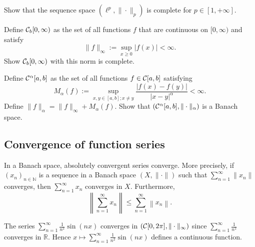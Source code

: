 \begin{exc}
  Show that the sequence space
  $(\ell^p, \|\cdot\|_p)$ is complete
  for $p\in[1,+\infty]$.
\end{exc}

\begin{exc}
  Define ${\cal C}_b[0,\infty)$ as the set of all functions
  $f$ that are continuous on $[0,\infty)$
  and satisfy
  \begin{displaymath}
    \|f\|_{\infty} := \sup_{x\ge 0}|f(x)| < \infty.
  \end{displaymath}
  Show ${\cal C}_b[0,\infty)$ with this norm is complete.
\end{exc}

\begin{exc}
  Define ${\cal C}^{\alpha}[a,b]$ as the set of all functions
  $f\in {\cal C}[a,b]$ satisfying
  \begin{displaymath}
    M_{\alpha}(f) := \sup_{x,y\in[a,b]; x\ne y}
    \frac{|f(x)-f(y)|}{|x-y|^{\alpha}} < \infty.
  \end{displaymath}
  Define $\|f\|_{\alpha} = \|f\|_{\infty}+M_{\alpha}(f)$.
  Show that $({\cal C}^{\alpha}[a,b], \|\cdot\|_{\alpha})$
  is a Banach space.
\end{exc}

\subsection{Convergence of function series}

\begin{thm}
  \label{thm:absolutelyConvergentSeriesConvergeInBanach}
  In a Banach space, absolutely convergent series converge.
  More precisely,
  if $(x_n)_{n\in \mathbb{N}}$ is a sequence
  in a Banach space $(X, \|\cdot\|)$
  such that $\sum_{n=1}^{\infty} \|x_n\|$ converges,
  then $\sum_{n=1}^{\infty} x_n$ converges in $X$.
  Furthermore,
  \begin{equation}
    \label{eq:triangleInequalityInfty}
    \left\|\sum_{n=1}^{\infty}x_n\right\|
    \le \sum_{n=1}^{\infty} \left\|x_n\right\|.
  \end{equation}
\end{thm}

\begin{exm}
  The series $\sum_{n=1}^{\infty}\frac{1}{n^2}\sin(nx)$
  converges in $({\cal C}[0,2 \pi], \|\cdot\|_{\infty})$
  since $\sum_{n=1}^{\infty}\frac{1}{n^2}$ converges in $\mathbb{R}$.
  Hence $x\mapsto \sum_{n=1}^{\infty}\frac{1}{n^2}\sin(nx)$
  defines a continuous function. 
\end{exm}

